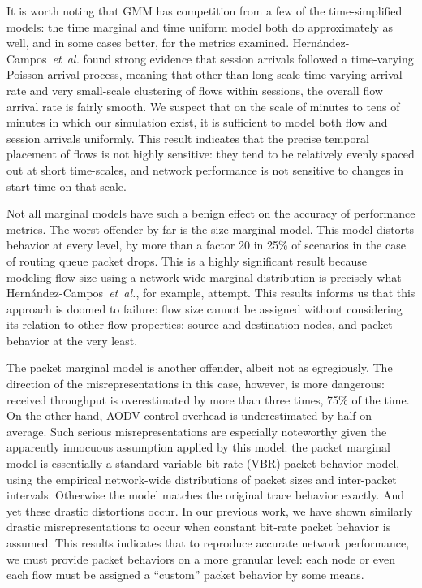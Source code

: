 \documentclass[twocolumn,final]{svjour3}
\newcommand{\caps}[1]{{\small{#1}}}
\newcommand{\FHC}{Hern\'andez-Campos~\textit{et~al.}}
\newcommand{\model}[1]{\textsf{\small{#1}}}
\begin{document}
It is worth noting that \caps{GMM} has competition from a few of the time-simplified models: the \model{time marginal} and \model{time uniform} model both do approximately as well, and in some cases better, for the metrics examined. {\FHC} found strong evidence that session arrivals followed a time-varying Poisson arrival process, meaning that other than long-scale time-varying arrival rate and very small-scale clustering of flows within sessions, the overall flow arrival rate is fairly smooth. We suspect that on the scale of minutes to tens of minutes in which our simulation exist, it is sufficient to model both flow and session arrivals uniformly. This result indicates that the precise temporal placement of flows is not highly sensitive: they tend to be relatively evenly spaced out at short time-scales, and network performance is not sensitive to changes in start-time on that scale.

Not all marginal models have such a benign effect on the accuracy of performance metrics. The worst offender by far is the \model{size marginal} model. This model distorts behavior at every level, by more than a factor 20 in 25\% of scenarios in the case of routing queue packet drops. This is a highly significant result because modeling flow size using a network-wide marginal distribution is precisely what {\FHC}, for example, attempt. This results informs us that this approach is doomed to failure: flow size cannot be assigned without considering its relation to other flow properties: source and destination nodes, and packet behavior at the very least.

The \model{packet marginal} model is another offender, albeit not as egregiously. The direction of the misrepresentations in this case, however, is more dangerous: received throughput is overestimated by more than three times, 75\% of the time. On the other hand, \caps{AODV} control overhead is underestimated by half on average. Such serious misrepresentations are especially noteworthy given the apparently innocuous assumption applied by this model: the \model{packet marginal} model is essentially a standard variable bit-rate (\caps{VBR}) packet behavior model, using the empirical network-wide distributions of packet sizes and inter-packet intervals. Otherwise the model matches the original trace behavior exactly. And yet these drastic distortions occur. In our previous work, we have shown similarly drastic misrepresentations to occur when constant bit-rate packet behavior is assumed. This results indicates that to reproduce accurate network performance, we must provide packet behaviors on a more granular level: each node or even each flow must be assigned a ``custom'' packet behavior by some means.
\end{document}
